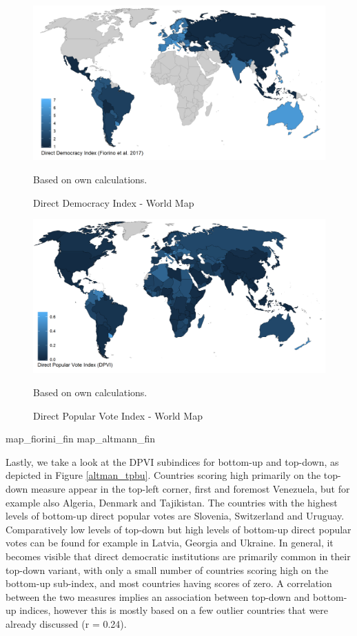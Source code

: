 \documentclass[]{article}
\begin{document}
\begin{figure}[!th]
    \caption{Direct Democracy Index - World Map}
    \label{map_fiorini_fin}
    \includegraphics[width=\textwidth]{images/map_fiorini_fin.png}
    \flushright
    {\scriptsize Based on own calculations. \par}
\end{figure}\begin{figure}[!th]
    \caption{Direct Popular Vote Index - World Map}
    \label{map_altmann_fin}
    \includegraphics[width=\textwidth]{images/map_altmann_fin.png}
    \flushright
    {\scriptsize Based on own calculations. \par}
\end{figure}

map\_fiorini\_fin map\_altmann\_fin

Lastly, we take a look at the DPVI subindices for bottom-up and
top-down, as depicted in Figure \ref{altman_tpbu}. Countries scoring
high primarily on the top-down measure appear in the top-left corner,
first and foremost Venezuela, but for example also Algeria, Denmark and
Tajikistan. The countries with the highest levels of bottom-up direct
popular votes are Slovenia, Switzerland and Uruguay. Comparatively low
levels of top-down but high levels of bottom-up direct popular votes can
be found for example in Latvia, Georgia and Ukraine. In general, it
becomes visible that direct democratic institutions are primarily common
in their top-down variant, with only a small number of countries scoring
high on the bottom-up sub-index, and most countries having scores of
zero. A correlation between the two measures implies an association
between top-down and bottom-up indices, however this is mostly based on
a few outlier countries that were already discussed (r = 0.24).
\end{document}
